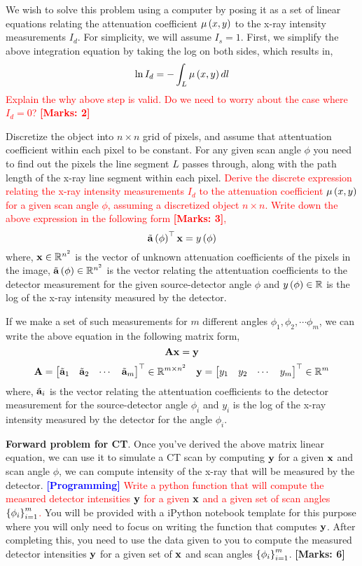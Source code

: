 \documentclass[12pt]{article}
\def\mf{\ensuremath\mathbf}
\def\mb{\ensuremath\mathbb}
\def\lp{\ensuremath\left(}
\def\rp{\ensuremath\right)}
\def\lc{\ensuremath\left\{}
\def\rc{\ensuremath\right\}}
\def\emx{\ensuremath\end{bmatrix*}}
\def\bmxc{\ensuremath\begin{bmatrix*}[c]}
\newcommand{\ct}[1]{\lp #1\rp}
\begin{document}
\begin{enumerate}
We wish to solve this problem using a computer by posing it as a set of linear equations relating the attenuation coefficient $\mu\ct{x,y}$ to the x-ray intensity measurements $I_d$. For simplicity, we will assume $I_s = 1$. First, we simplify the above integration equation by taking the log on both sides, which results in,
\[ \ln I_d = - \int_L \mu \ct{x, y} dl \]
\textcolor{red}{Explain the why above step is valid. Do we need to worry about the case where $I_d = 0$? \textbf{[Marks: 2]}}

Discretize the object into $n \times n$ grid of pixels, and assume that attentuation coefficient within each pixel to be constant. For any given scan angle $\phi$ you need to find out the pixels the line segment $L$ passes through, along with the path length of the x-ray line segment within each pixel. \textcolor{red}{Derive the discrete expression relating the x-ray intensity measurements $I_d$ to the attenuation coefficient $\mu\ct{x,y}$ for a given scan angle $\phi$, assuming a discretized object $n \times n$. Write down the above expression in the following form \textbf{[Marks: 3]},
\[ \tilde{\mf{a}}\ct{\phi}^\top \mf{x} = y\ct{\phi} \]}
where, $\mf{x} \in \mb{R}^{n^2}$ is the vector of unknown attenuation coefficients of the pixels in the image, $\tilde{\mf{a}}\ct{\phi} \in \mb{R}^{n^2}$ is the vector relating the attentuation coefficients to the detector measurement for the given source-detector angle $\phi$ and $y\ct{\phi} \in \mb{R}$ is the log of the x-ray intensity measured by the detector. 

If we make a set of such measurements for $m$ different angles $\phi_1, \phi_2, \cdots \phi_m$, we can write the above equation in the following matrix form,
\[ \mf{A}\mf{x} = \mf{y} \]
\[ \mf{A} = \bmxc \tilde{\mf{a}}_1 & \tilde{\mf{a}}_2 & \cdots & \tilde{\mf{a}}_m\emx^\top \in \mb{R}^{m \times n^2}\quad \mf{y} = \bmxc y_1 & y_2 & \cdots & y_m\emx^\top \in \mb{R}^{m} \]
where, $\tilde{\mf{a}}_i$ is the vector relating the attentuation coefficients to the detector measurement for the source-detector angle $\phi_i$ and $y_i$ is the log of the x-ray intensity measured by the detector for the angle $\phi_i$.

\textbf{Forward problem for CT}. Once you've derived the above matrix linear equation, we can use it to simulate a CT scan by computing $\mf{y}$ for a given $\mf{x}$ and scan angle $\phi$, we can compute intensity of the x-ray that will be measured by the detector. \textcolor{red}{\textcolor{blue}{\textbf{[Programming]}} Write a python function that will compute the measured detector intensities $\mf{y}$ for a given $\mf{x}$ and a given set of scan angles $\lc \phi_i \rc_{i=1}^{m}$.} You will be provided with a iPython notebook template for this purpose where you will only need to focus on writing the function that computes $\mf{y}$. After completing this, you need to use the data given to you to compute the measured detector intensities $\mf{y}$ for a given set of $\mf{x}$ and scan angles $\lc \phi_i \rc_{i=1}^{m}$. \textbf{[Marks: 6]}

\end{enumerate}
\end{document}
